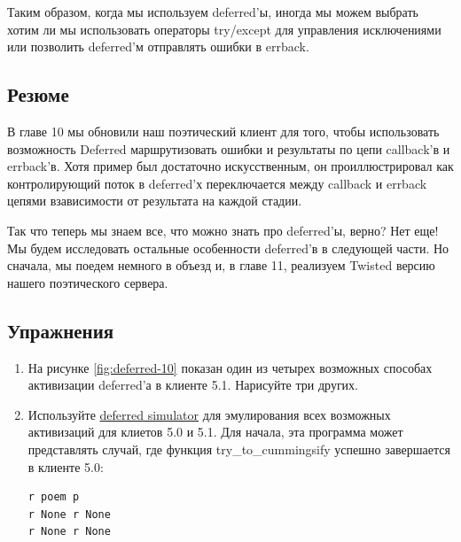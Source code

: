 Таким образом, когда мы используем deferred'ы, 
иногда мы можем выбрать хотим ли мы использовать 
операторы try/except для управления исключениями или позволить deferred'м 
отправлять ошибки в errback.


\subsection{Резюме}


В главе 10 мы обновили наш поэтический клиент для 
того, чтобы использовать возможность Deferred 
маршрутизовать ошибки и результаты по цепи callback'в и errback'в. 
Хотя пример был достаточно искусственным, он проиллюстрировал 
как контролирующий поток в deferred'х переключается 
между callback и errback цепями взависимости от результата 
на каждой стадии.


Так что теперь мы знаем все, что можно знать про deferred'ы, верно? 
Нет еще! Мы будем исследовать остальные особенности deferred'в в 
следующей части. Но сначала, мы поедем немного в объезд и, в главе 11, 
реализуем Twisted версию нашего поэтического сервера.  

\subsection{Упражнения}

\begin{enumerate}

\item На рисунке \ref{fig:deferred-10} показан один из четырех 
возможных способах активизации deferred'а в клиенте 5.1. Нарисуйте 
три других. 

\item Используйте \href{http://github.com/jdavisp3/twisted-intro/blob/master/twisted-deferred/deferred-simulator.py#L1}{deferred simulator} для эмулирования всех возможных активизаций для клиетов 5.0 и 5.1. 
Для начала, эта программа может представлять случай, где функция try\_to\_cummingsify 
успешно завершается в клиенте 5.0: 

\begin{scriptsize}\begin{verbatim}
r poem p
r None r None
r None r None
\end{verbatim}\end{scriptsize}

\end{enumerate}
